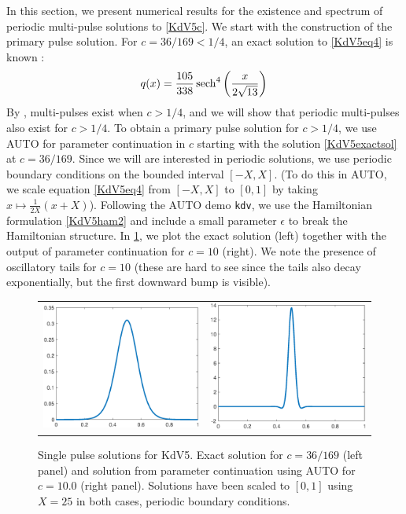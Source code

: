 \documentclass[11pt,reqno]{amsart}
\theoremstyle{plain}
\theoremstyle{definition}
\theoremstyle{remark}
\begin{document}
In this section, we present numerical results for the existence and spectrum of periodic multi-pulse solutions to \cref{KdV5c}. We start with the construction of the primary pulse solution. For $c = 36/169 < 1/4$, an exact solution to \cref{KdV5eq4} is known \cite[(3)]{Pelinovsky2007}:
\begin{equation}\label{KdV5exactsol}
q(x) = \frac{105}{338}\mathop\mathrm{sech}\nolimits^4\left(\frac{x}{2\sqrt{13}} \right)
\end{equation}
By \cite{Pelinovsky2007}, multi-pulses exist when $c > 1/4$, and we will show that periodic multi-pulses also exist for $c > 1/4$. To obtain a primary pulse solution for $c > 1/4$, we use AUTO for parameter continuation in $c$ starting with the solution \cref{KdV5exactsol} at $c = 36/169$. Since we will are interested in periodic solutions, we use periodic boundary conditions on the bounded interval $[-X,X]$. (To do this in AUTO, we scale equation \cref{KdV5eq4} from $[-X, X]$ to $[0, 1]$ by taking $x \mapsto \frac{1}{2X}(x + X)$). Following the AUTO demo \texttt{kdv}, we use the Hamiltonian formulation \cref{KdV5ham2} and include a small parameter $\epsilon$ to break the Hamiltonian structure. In \cref{fig:KdV5singlepulse}, we plot the exact solution (left) together with the output of parameter continuation for $c = 10$ (right). We note the presence of oscillatory tails for $c = 10$ (these are hard to see since the tails also decay exponentially, but the first downward bump is visible).
\begin{figure}
\begin{center}
\begin{tabular}{cc}
\includegraphics[width=7cm]{images/singleexact.eps} &
\includegraphics[width=7cm]{images/single10}
\end{tabular}
\caption[Primary pulse solutions for KdV5]{Single pulse solutions for KdV5. Exact solution for $c = 36/169$ (left panel) and solution from parameter continuation using AUTO for $c = 10.0$ (right panel). Solutions have been scaled to $[0, 1]$ using $X = 25$ in both cases, periodic boundary conditions.}
\label{fig:KdV5singlepulse}
\end{center}
\end{figure}
\end{document}
